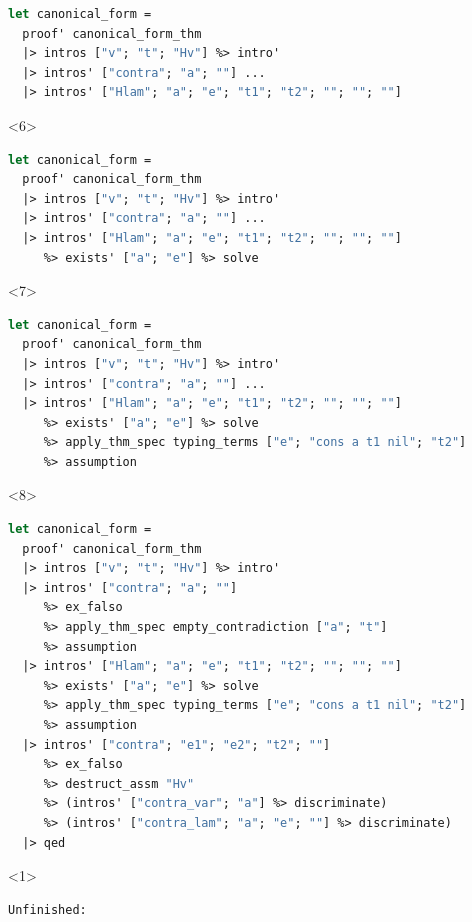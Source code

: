 \documentclass[aspectratio=169]{beamer}
\begin{document}
\begin{frame}[fragile]
\begin{overlayarea}{\linewidth}{3.5cm}
\begin{onlyenv}
\begin{lstlisting}[mathescape,language=OCaml,escapebegin=\color{codepurple}]
let canonical_form =
  proof' canonical_form_thm
  |> intros ["v"; "t"; "Hv"] %> intro'
  |> intros' ["contra"; "a"; ""] ...
  |> intros' ["Hlam"; "a"; "e"; "t1"; "t2"; ""; ""; ""]
\end{lstlisting}
\end{onlyenv}
  \begin{onlyenv}<6>
  \begin{lstlisting}[mathescape,language=OCaml,escapebegin=\color{codepurple}]
let canonical_form =
  proof' canonical_form_thm
  |> intros ["v"; "t"; "Hv"] %> intro'
  |> intros' ["contra"; "a"; ""] ...
  |> intros' ["Hlam"; "a"; "e"; "t1"; "t2"; ""; ""; ""]
     %> exists' ["a"; "e"] %> solve
\end{lstlisting}
\end{onlyenv}
  \begin{onlyenv}<7>
  \begin{lstlisting}[mathescape,language=OCaml,escapebegin=\color{codepurple}]
let canonical_form =
  proof' canonical_form_thm
  |> intros ["v"; "t"; "Hv"] %> intro'
  |> intros' ["contra"; "a"; ""] ...
  |> intros' ["Hlam"; "a"; "e"; "t1"; "t2"; ""; ""; ""]
     %> exists' ["a"; "e"] %> solve
     %> apply_thm_spec typing_terms ["e"; "cons a t1 nil"; "t2"]
     %> assumption
\end{lstlisting}
\end{onlyenv}
  \begin{onlyenv}<8>
  \begin{lstlisting}[mathescape,language=OCaml,escapebegin=\color{codepurple}]
let canonical_form =
  proof' canonical_form_thm
  |> intros ["v"; "t"; "Hv"] %> intro'
  |> intros' ["contra"; "a"; ""]
     %> ex_falso
     %> apply_thm_spec empty_contradiction ["a"; "t"]
     %> assumption
  |> intros' ["Hlam"; "a"; "e"; "t1"; "t2"; ""; ""; ""]
     %> exists' ["a"; "e"] %> solve
     %> apply_thm_spec typing_terms ["e"; "cons a t1 nil"; "t2"]
     %> assumption
  |> intros' ["contra"; "e1"; "e2"; "t2"; ""]
     %> ex_falso
     %> destruct_assm "Hv"
     %> (intros' ["contra_var"; "a"] %> discriminate)
     %> (intros' ["contra_lam"; "a"; "e"; ""] %> discriminate)
  |> qed
\end{lstlisting}
\end{onlyenv}
\end{overlayarea}
\begin{overlayarea}{\linewidth}{2cm}
  \begin{onlyenv}<1>
  \begin{lstlisting}[mathescape]
Unfinished:


\end{lstlisting}
\end{onlyenv}
\end{overlayarea}
\end{frame}
\end{document}
